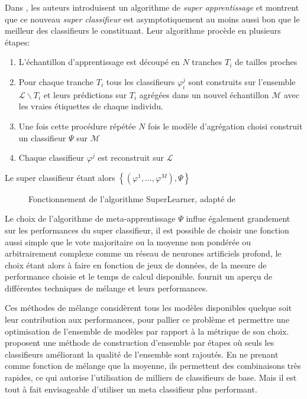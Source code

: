 Dans \citet{VanderLaan2007a}, les auteurs introduisent un algorithme de \emph{super apprentissage} et montrent que ce nouveau \emph{super classifieur} est asymptotiquement au moins aussi bon que le meilleur des classifieurs le constituant.
Leur algorithme procède en plusieurs étapes:
\begin{enumerate}
    \item L'échantillon d'apprentissage est découpé en $N$ tranches $T_i$ de tailles proches
    \item Pour chaque tranche $T_i$ tous les classifieurs $\varphi_i^j$ sont construits sur l'ensemble $\mathcal{L} \smallsetminus T_i$ et leurs prédictions sur $T_i$ agrégées dans un nouvel échantillon $\mathcal{M}$ avec les vraies étiquettes de chaque individu.
    \item Une fois cette procédure répétée $N$ fois le modèle d'agrégation choisi construit un classifieur $\Psi$ sur $\mathcal{M}$
    \item Chaque classifieur $\varphi^j$ est reconstruit sur $\mathcal{L}$ 
\end{enumerate}
Le super classifieur étant alors $\left\{ (\varphi^1,\dotsc,\varphi^M), \Psi \right\}$

\begin{figure}[htbp]
    \caption{Fonctionnement de l'algorithme SuperLearner, adapté de \citet{VanderLaan2007a}}
\end{figure}

Le choix de l'algorithme de meta-apprentissage $\Psi$ influe également grandement sur les performances du super classifieur, il est possible de choisir une fonction aussi simple que le vote majoritaire ou la moyenne non pondérée ou arbitrairement complexe comme un réseau de neurones artificiels profond, le choix étant alors à faire en fonction de jeux de données, de la mesure de performance choisie et le temps de calcul disponible. \citet{Jahrer2010} fournit un aperçu de différentes techniques de mélange et leurs performances.

Ces méthodes de mélange considèrent tous les modèles disponibles quelque soit leur contribution aux performances, pour pallier ce problème et permettre une optimisation de l'ensemble de modèles par rapport à la métrique de son choix. \citet{Caruana2011a} proposent une méthode de construction d'ensemble par étapes où seuls les classifieurs améliorant la qualité de l'ensemble sont rajoutés. En ne prenant comme fonction de mélange que la moyenne, ils permettent des combinaisons très rapides, ce qui autorise l'utilisation de milliers de classifieurs de base. Mais il est tout à fait envisageable d'utiliser un meta classifieur plus performant.

